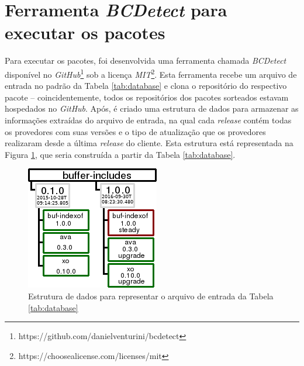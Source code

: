 \section{Ferramenta \textit{BCDetect} para executar os pacotes}
\label{sec:bcdetect}
Para executar os pacotes, foi desenvolvida uma ferramenta chamada \textit{BCDetect} disponível no \textit{GitHub}\footnote{https://github.com/danielventurini/bcdetect} sob a licença \textit{MIT}\footnote{https://choosealicense.com/licenses/mit}. Esta ferramenta recebe um arquivo de entrada no padrão da Tabela \ref{tab:database} e clona o repositório do respectivo pacote -- coincidentemente, todos os repositórios dos pacotes sorteados estavam hospedados no \textit{GitHub}. Após, é criado uma estrutura de dados para armazenar as informações extraídas do arquivo de entrada, na qual cada \textit{release} contém todas os provedores com suas versões e o tipo de atualização que os provedores realizaram desde a última \textit{release} do cliente. Esta estrutura está representada na Figura \ref{fig:bc_work}, que seria construída a partir da Tabela \ref{tab:database}.

\begin{figure}
    \centering
    \includegraphics[scale=2]{figuras/bcdetect_work.png}
    \caption{Estrutura de dados para representar o arquivo de entrada da Tabela \ref{tab:database}}
    \label{fig:bc_work}
\end{figure}{}

